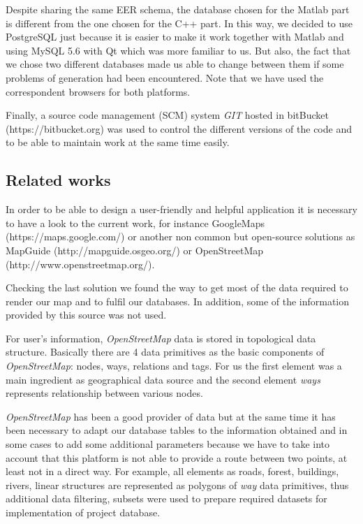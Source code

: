 \documentclass{article}
\begin{document}
Despite sharing the same EER schema, the database chosen for the Matlab part is different from the one chosen for the C++ part. In this way, we decided to use PostgreSQL just because it is easier to make it work together with Matlab and using MySQL 5.6 with Qt which was more familiar to us. But also, the fact that we chose two different databases made us able to change between them if some problems of generation had been encountered. Note that we have used the correspondent browsers for both platforms.

Finally, a source code management (SCM) system \textit{GIT} hosted in bitBucket (https://bitbucket.org) was used to control the different versions of the code and to be able to maintain work at the same time easily.

\subsection{Related works}

In order to be able to design a user-friendly and helpful application it is necessary to have a look to the current work, for instance GoogleMaps (https://maps.google.com/) or another non common but open-source solutions as MapGuide (http://mapguide.osgeo.org/) or OpenStreetMap (http://www.openstreetmap.org/). 

Checking the last solution we found the way to get most of the data required to render our map and to fulfil our databases. In addition, some of the information provided by this source was not used.

For user's information, \textit{OpenStreetMap} data is stored in topological data structure. Basically there are 4 data primitives as the basic components of \textit{OpenStreetMap}: nodes, ways, relations and tags. For us the first element was a main ingredient as geographical data source and the second element \textit{ways} represents relationship between various nodes. 

\textit{OpenStreetMap} has been a good provider of data but at the same time it has been necessary to adapt our database tables to the information obtained and in some cases to add some additional parameters because we have to take into account that this platform is not able to provide a route between two points, at least not in a direct way. For example, all elements as roads, forest, buildings, rivers, linear structures are represented as polygons of \textit{way} data primitives, thus additional data filtering, subsets were used to prepare required datasets for implementation of project database.
\end{document}
